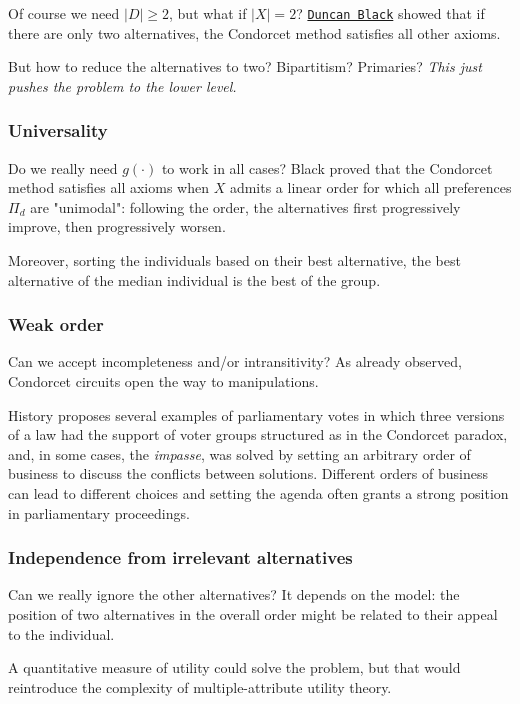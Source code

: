 Of course we need $|D| \geq 2$, but what if $|X| = 2$? \href{https://en.wikipedia.org/wiki/Duncan\_Black}{\texttt{Duncan Black}} showed that if there are only two alternatives, the Condorcet method satisfies all other axioms. 

But how to reduce the alternatives to two? Bipartitism? Primaries? \textit{This just pushes the problem to the lower level.}

\subsubsection{Universality}

Do we really need $g(\cdot)$ to work in all cases? Black proved that the Condorcet method satisfies all axioms when $X$ admits a linear order for which all preferences $\Pi_d$ are "unimodal": following the order, the alternatives first progressively improve, then progressively worsen.

Moreover, sorting the individuals based on their best alternative, the best alternative of the median individual is the best of the group.

\subsubsection{Weak order}

Can we accept incompleteness and/or intransitivity? As already observed, Condorcet circuits open the way to manipulations.

History proposes several examples of parliamentary votes in which three versions of a law had the support of voter groups structured as in the Condorcet paradox, and, in some cases, the \textit{impasse}, was solved by setting an arbitrary order of business to discuss the conflicts between solutions. Different orders of business can lead to different choices and setting the agenda often grants a strong position in parliamentary proceedings.

\subsubsection{Independence from irrelevant alternatives}

Can we really ignore the other alternatives? It depends on the model: the position of two alternatives in the overall order might be related to their appeal to the individual.

A quantitative measure of utility could solve the problem, but that would reintroduce the complexity of multiple-attribute utility theory.

